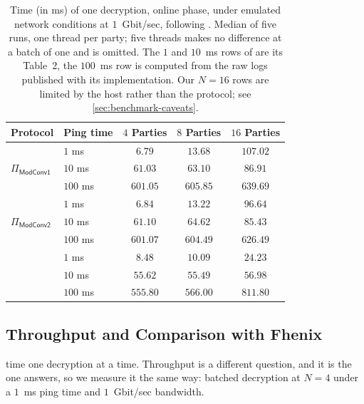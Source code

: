 \begin{table}[tbp]
    \caption{%
        Time (in ms) of one decryption, online phase, under emulated network conditions at $1$~Gbit/sec, following \cite[Table~2]{CCS:ZZLP25}.
        Median of five runs, one thread per party; five threads makes no difference at a batch of one and is omitted.
        The $1$ and $10$~ms rows of \cite{CCS:ZZLP25} are its Table~2, the $100$~ms row is computed from the raw logs published with its implementation.
        Our $N = 16$ rows are limited by the host rather than the protocol; see \cref{sec:benchmark-caveats}.%
    }
    \label{tab:benchmark-latency}
    \centering
    \small
    \setlength{\tabcolsep}{4pt}
    \begin{tabular}{@{}llccc@{}}
        \toprule
        Protocol & Ping time & $4$ Parties & $8$ Parties & $16$ Parties \\
        \midrule
        \multirow{3}{*}{$\Pi_\mathsf{ModConv1}$}
            & $1$ ms & $6.79$ & $13.68$ & $107.02$ \\
            & $10$ ms & $61.03$ & $63.10$ & $86.91$ \\
            & $100$ ms & $601.05$ & $605.85$ & $639.69$ \\
        \midrule
        \multirow{3}{*}{$\Pi_\mathsf{ModConv2}$}
            & $1$ ms & $6.84$ & $13.22$ & $96.64$ \\
            & $10$ ms & $61.10$ & $64.62$ & $85.43$ \\
            & $100$ ms & $601.07$ & $604.49$ & $626.49$ \\
        \midrule
        \multirow{3}{*}{\cite{CCS:ZZLP25}}
            & $1$ ms & $8.48$ & $10.09$ & $24.23$ \\
            & $10$ ms & $55.62$ & $55.49$ & $56.98$ \\
            & $100$ ms & $555.80$ & $566.00$ & $811.80$ \\
        \bottomrule
    \end{tabular}
\end{table}


\subsection{Throughput and Comparison with Fhenix}
\label{sec:benchmark-comparison}

 time one decryption at a time.
Throughput is a different question, and it is the one \cite[Table~1]{CCS:ZZLP25} answers, so we measure it the same way: batched decryption at $N = 4$ under a $1$~ms ping time and $1$~Gbit/sec bandwidth.

